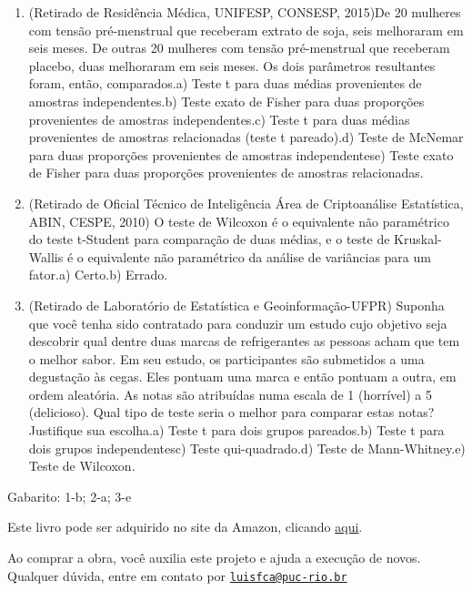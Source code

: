 \documentclass[
]{book}
\begin{document}
\begin{enumerate}
\def\labelenumi{\arabic{enumi}.}
\item
  (Retirado de Residência Médica, UNIFESP, CONSESP, 2015)De 20 mulheres com tensão pré-menstrual que receberam extrato de soja, seis melhoraram em seis meses. De outras 20 mulheres com tensão pré-menstrual que receberam placebo, duas melhoraram em seis meses. Os dois parâmetros resultantes foram, então, comparados.a) Teste t para duas médias provenientes de amostras independentes.b) Teste exato de Fisher para duas proporções provenientes de amostras independentes.c) Teste t para duas médias provenientes de amostras relacionadas (teste t pareado).d) Teste de McNemar para duas proporções provenientes de amostras independentese) Teste exato de Fisher para duas proporções provenientes de amostras relacionadas.
\item
  (Retirado de Oficial Técnico de Inteligência Área de Criptoanálise Estatística, ABIN, CESPE, 2010) O teste de Wilcoxon é o equivalente não paramétrico do teste t-Student para comparação de duas médias, e o teste de Kruskal-Wallis é o equivalente não paramétrico da análise de variâncias para um fator.a) Certo.b) Errado.
\item
  (Retirado de Laboratório de Estatística e Geoinformação-UFPR) Suponha que você tenha sido contratado para conduzir um estudo cujo objetivo seja descobrir qual dentre duas marcas de refrigerantes as pessoas acham que tem o melhor sabor. Em seu estudo, os participantes são submetidos a uma degustação às cegas. Eles pontuam uma marca e então pontuam a outra, em ordem aleatória. As notas são atribuídas numa escala de 1 (horrível) a 5 (delicioso). Qual tipo de teste seria o melhor para comparar estas notas? Justifique sua escolha.a) Teste t para dois grupos pareados.b) Teste t para dois grupos independentesc) Teste qui-quadrado.d) Teste de Mann-Whitney.e) Teste de Wilcoxon.
\end{enumerate}

Gabarito: 1-b; 2-a; 3-e

Este livro pode ser adquirido no site da Amazon, clicando \href{https://www.amazon.com.br/gp/product/B097CP7T9M?pf_rd_r=RDZC8XYMBC1WY69T0J8K\&pf_rd_p=abb22e6b-8812-4b76-a424-5f0b098d2c90\&pd_rd_r=ceec1911-f409-4acd-ac8f-2d5bc68dac43\&pd_rd_w=wMUzJ\&pd_rd_wg=ZK85a\&ref_=pd_gw_unk}{aqui}.

Ao comprar a obra, você auxilia este projeto e ajuda a execução de novos. Qualquer dúvida, entre em contato por \href{mailto:luisfca@puc-rio.br}{\nolinkurl{luisfca@puc-rio.br}}
\end{document}

